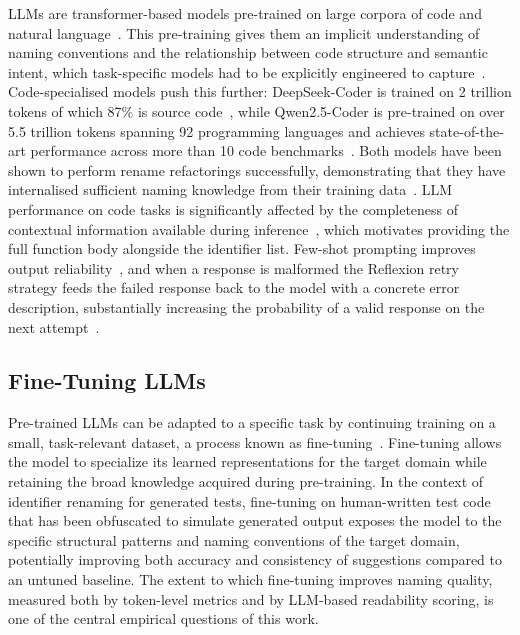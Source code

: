 \documentclass[conference]{IEEEtran}
\begin{document}
LLMs are transformer-based models pre-trained on large corpora of code and
natural language~\cite{brown2020gpt3}.
This pre-training gives them an implicit understanding of naming conventions
and the relationship between code structure and semantic intent, which
task-specific models had to be explicitly engineered to
capture~\cite{allamanis2018learning,fan2023llmse}.
Code-specialised models push this further: DeepSeek-Coder is trained on 2
trillion tokens of which 87\% is source code~\cite{guo2024deepseekcoder},
while Qwen2.5-Coder is pre-trained on over 5.5 trillion tokens spanning 92
programming languages and achieves state-of-the-art performance across more
than 10 code benchmarks~\cite{hui2024qwen25coder}.
Both models have been shown to perform rename refactorings successfully,
demonstrating that they have internalised sufficient naming knowledge from
their training data~\cite{cordeiro2024refactoring}.
LLM performance on code tasks is significantly affected by the completeness of
contextual information available during inference~\cite{wang2024naming}, which
motivates providing the full function body alongside the identifier list.
Few-shot prompting improves output reliability~\cite{brown2020gpt3}, and when a
response is malformed the Reflexion retry strategy feeds the failed response
back to the model with a concrete error description, substantially increasing
the probability of a valid response on the next
attempt~\cite{shinn2023reflexion,ravi2025llmloop}.

\subsection{Fine-Tuning LLMs}

Pre-trained LLMs can be adapted to a specific task by continuing training on a
small, task-relevant dataset, a process known as fine-tuning~\cite{hosna2022transfer,church2021finetuning}.
Fine-tuning allows the model to specialize its learned representations for the
target domain while retaining the broad knowledge acquired during pre-training.
In the context of identifier renaming for generated tests, fine-tuning on
human-written test code that has been obfuscated to simulate generated output
exposes the model to the specific structural patterns and naming conventions of
the target domain, potentially improving both accuracy and consistency of
suggestions compared to an untuned baseline.
The extent to which fine-tuning improves naming quality, measured both by
token-level metrics and by LLM-based readability scoring, is one of the central
empirical questions of this work.
\end{document}
